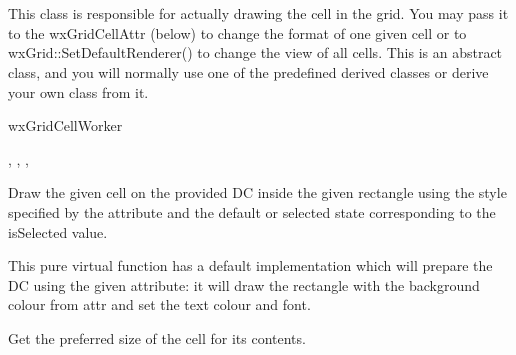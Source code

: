 \section{}\label{wxgridcellrenderer}

This class is responsible for actually drawing the cell
in the grid. You may pass it to the wxGridCellAttr (below) to change the
format of one given cell or to wxGrid::SetDefaultRenderer() to change the
view of all cells. This is an abstract class, and you will normally use one of the
predefined derived classes or derive your own class from it.


wxGridCellWorker


,\rtfsp
{},\rtfsp
{},\rtfsp
{}


\label{wxgridcellrendererdraw}


Draw the given cell on the provided DC inside the given rectangle
using the style specified by the attribute and the default or selected
state corresponding to the isSelected value.

This pure virtual function has a default implementation which will
prepare the DC using the given attribute: it will draw the rectangle
with the background colour from attr and set the text colour and font.

\label{wxgridcellrenderergetbestsize}


Get the preferred size of the cell for its contents.

\label{wxgridcellrendererclone}

